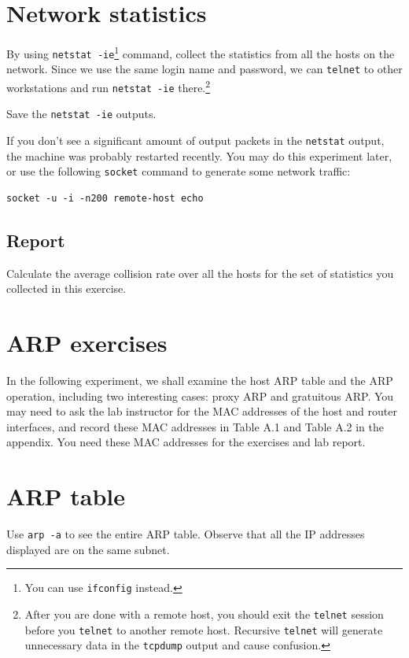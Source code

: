 \documentclass{../UTNetLab}
\begin{document}
\section{Network statistics}
    By using \lstinline{netstat -ie}\footnote{You can use \lstinline{ifconfig} instead.} command, collect the statistics from all the hosts on the network.
    Since we use the same login name and password, we can \lstinline{telnet} to other workstations and run \lstinline{netstat -ie} there.\footnote{%
    After you are done with a remote host, you should exit the \lstinline{telnet} session before you \lstinline{telnet} to another remote host.
    Recursive \lstinline{telnet} will generate unnecessary data in the \lstinline{tcpdump} output and cause confusion.
    }

    Save the \lstinline{netstat -ie} outputs.

    If you don’t see a significant amount of output packets in the \lstinline{netstat} output, the machine was probably restarted recently. You may do this experiment later, or use the following \lstinline{socket} command to generate some network traffic:
    \begin{lstlisting}[emph={remote-host}]
socket -u -i -n200 remote-host echo
    \end{lstlisting}
    
    \subsection*{Report}
    Calculate the average collision rate over all the hosts for the set of statistics you collected in this exercise.

\section*{ARP exercises}
    In the following experiment, we shall examine the host ARP table and the ARP operation, including two interesting cases: proxy ARP and gratuitous ARP. You may need to ask the lab instructor for the MAC addresses of the host and router interfaces, and record these MAC addresses in Table A.1 and Table A.2 in the appendix.
    You need these MAC addresses for the exercises and lab report.

\section{ARP table}
    Use \lstinline{arp -a} to see the entire ARP table.
    Observe that all the IP addresses displayed are on the same subnet.
\end{document}
